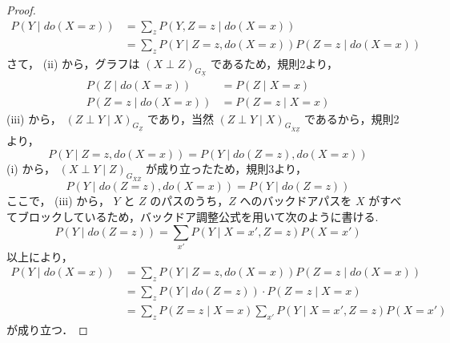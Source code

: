 \documentclass[uplatex, dvipdfmx]{jsarticle}
\begin{document}
\begin{proof}
  \begin{align}
    P(Y \mid do(X=x)) &= \sum_z P(Y, Z=z \mid do(X=x)) \\
    &= \sum_z P(Y \mid Z=z, do(X=x)) P(Z=z \mid do(X=x))
  \end{align}
  さて， (ii) から，グラフは $(X \perp Z)_{G_{\underline{X}}}$ であるため，規則2より，
  \begin{align}
    P(Z \mid do(X=x)) &= P(Z \mid X=x) \\
    P(Z=z \mid do(X=x)) &= P(Z=z \mid X=x)
  \end{align}
  (iii) から， $(Z \perp Y \mid X)_{G_{\underline{Z}}}$ であり，当然 $(Z \perp Y \mid X)_{G_{\overline{X}\underline{Z}}}$ であるから，規則2より，
  \begin{equation}
    P(Y \mid Z=z, do(X=x)) = P(Y \mid do(Z=z), do(X=x))
  \end{equation}
  (i) から， $(X \perp Y \mid Z)_{G_{\overline{X}\overline{Z}}}$ が成り立ったため，規則3より，
  \begin{equation}
    P(Y \mid do(Z=z), do(X=x)) = P(Y \mid do(Z=z))
  \end{equation}
  ここで， (iii) から， $Y$ と $Z$ のパスのうち，$Z$ へのバックドアパスを $X$ がすべてブロックしているため，バックドア調整公式を用いて次のように書ける.
  \begin{equation}
    P(Y \mid do(Z=z)) = \sum_{x'} P(Y \mid X=x', Z=z) P(X=x')
  \end{equation}
  以上により，
  \begin{align}
    P(Y \mid do(X=x)) &= \sum_z P(Y \mid Z=z, do(X=x)) P(Z=z \mid do(X=x)) \\
    &= \sum_z P(Y \mid do(Z=z)) \cdot P(Z=z \mid X=x) \\
    &= \sum_z P(Z=z \mid X=x) \sum_{x'} P(Y \mid X=x', Z=z) P(X=x')
  \end{align}
  が成り立つ．
\end{proof}
\end{document}

